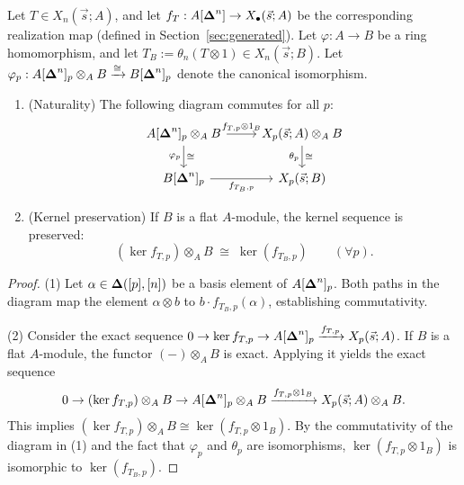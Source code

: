 \begin{corollary}\label{cor:base-change-naturality}
Let $T \in X_n(\vec{s};A)$, and let $f_T: A[\boldsymbol{\Delta}^n] \to X_\bullet(\vec{s};A)$ be the corresponding realization map (defined in Section~\ref{sec:generated}). Let $\varphi: A \to B$ be a ring homomorphism, and let $T_B := \theta_n(T \otimes 1) \in X_n(\vec{s};B)$. Let $\varphi_p: A[\boldsymbol{\Delta}^n]_p \otimes_A B \xrightarrow{\cong} B[\boldsymbol{\Delta}^n]_p$ denote the canonical isomorphism.

\begin{enumerate}
    \item (Naturality) The following diagram commutes for all $p$:
\[
\begin{tikzcd}
A[\sDelta^n]_p \otimes_A B \arrow[r, "f_{T,p} \otimes 1_B"] \arrow[d, "\varphi_p"', "\cong"] & X_p(\vec{s};A) \otimes_A B \arrow[d, "\theta_p"', "\cong"] \\
B[\sDelta^n]_p \arrow[r, "f_{T_B,p}"'] & X_p(\vec{s};B)
\end{tikzcd}
\]
    \item (Kernel preservation) If $B$ is a flat $A$-module, the kernel sequence is preserved:
\[
(\ker f_{T,p}) \otimes_A B \;\cong\; \ker(f_{T_B,p}) \qquad (\forall p).
\]
\end{enumerate}
\end{corollary}

\begin{proof}
(1) Let $\alpha \in \boldsymbol{\Delta}([p],[n])$ be a basis element of $A[\boldsymbol{\Delta}^n]_p$. Both paths in the diagram map the element $\alpha \otimes b$ to $b \cdot f_{T_B,p}(\alpha)$, establishing commutativity.

(2) Consider the exact sequence $0 \to \ker f_{T,p} \to A[\boldsymbol{\Delta}^n]_p \xrightarrow{f_{T,p}} X_p(\vec{s};A)$. If $B$ is a flat $A$-module, the functor $(-) \otimes_A B$ is exact. Applying it yields the exact sequence
\[
0 \to (\ker f_{T,p}) \otimes_A B \to A[\boldsymbol{\Delta}^n]_p \otimes_A B \xrightarrow{f_{T,p} \otimes 1_B} X_p(\vec{s};A) \otimes_A B.
\]
This implies $(\ker f_{T,p}) \otimes_A B \cong \ker(f_{T,p} \otimes 1_B)$. By the commutativity of the diagram in (1) and the fact that $\varphi_p$ and $\theta_p$ are isomorphisms, $\ker(f_{T,p} \otimes 1_B)$ is isomorphic to $\ker(f_{T_B,p})$.
\end{proof}
